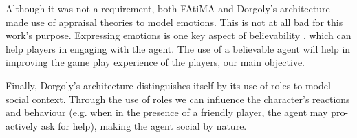 Although it was not a requirement, both \ac{FAtiMA} and Dorgoly's architecture made use of appraisal theories to model emotions.
This is not at all bad for this work's purpose.
Expressing emotions is one key aspect of believability \cite{bates:believable-agents}, which can help players in engaging with the agent.
The use of a believable agent will help in improving the game play experience of the players, our main objective.

Finally, Dorgoly's architecture distinguishes itself by its use of roles to model social context.
Through the use of roles we can influence the character's reactions and behaviour (e.g. when in the presence of a friendly player, the agent may pro-actively ask for help), making the agent social by nature.
